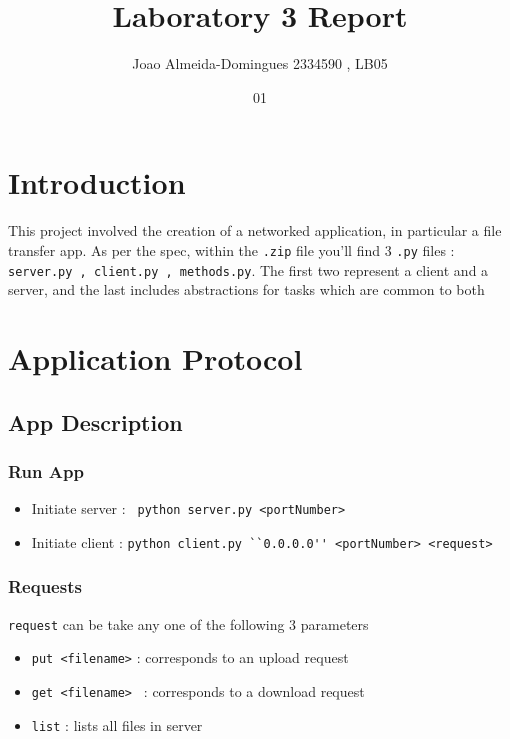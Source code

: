 \documentclass[english,course]{Notes}
\title{Laboratory 3 Report}
\author{Joao Almeida-Domingues 2334590 , LB05}
\date{01}{11}{2019}
\begin{document}
\newpage

\section{Introduction}

\par{This project involved the creation of a networked application, in particular a file transfer app. As per the spec, within the \verb!.zip! file you'll find 3 \verb!.py! files : \verb!server.py , client.py , methods.py!. The first two represent a client and a server, and the last includes abstractions for tasks which are common to both}

\section{Application Protocol}

\subsection{App Description}
\subsubsection{Run App}
\begin{itemize}
	\item[] Initiate server : \verb! python server.py <portNumber>!
	\item[] Initiate client : \verb!python client.py ``0.0.0.0'' <portNumber> <request>!

\end{itemize}
\subsubsection{Requests}

\noindent \par{\verb!request! can be take any one of the following 3 parameters}
\begin{itemize}
	\item[] \verb!put <filename>! : corresponds to an upload request 

	\item[] \verb!get <filename> !  : corresponds to a download request 
	
	\item[] \verb!list! : lists all files in server
	
\end{itemize}
\end{document}
